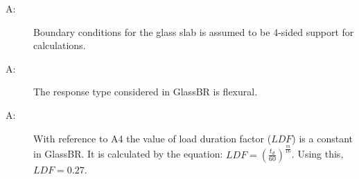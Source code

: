 \documentclass[12pt]{article}
\newcounter{assumpnum}
\newcommand{\atheassumpnum}{A\theassumpnum}
\begin{document}
\begin{description}
\item[\atheassumpnum\label{A:assumption6}:]Boundary conditions for the glass slab is assumed to be 4-sided support for calculations.
\end{description}
\begin{description}
\item[\atheassumpnum\label{A:assumption7}:]The response type considered in GlassBR is flexural.
\end{description}
\begin{description}
\item[\atheassumpnum\label{A:assumption8}:]With reference to A4 the value of load duration factor ($LDF$) is a constant in GlassBR. It is calculated by the equation: $LDF=\left(\frac{{t_{d}}}{60}\right)^{\frac{m}{16}}$. Using this, $LDF=0.27$.
\end{description}
\end{document}
